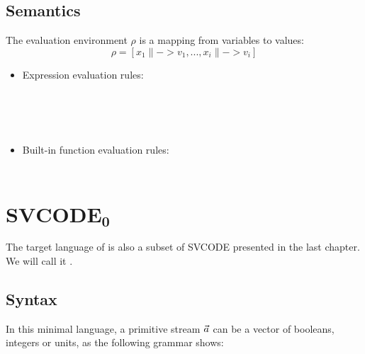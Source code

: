 \subsection{Semantics}
The evaluation environment $\rho$ is a mapping from variables to values: $$ \rho = [x_1 \|-> v_1,...,x_i \|-> v_i]$$ 

\begin{itemize}
\item Expression evaluation rules:
	
	\\[2ex]
	
	\\[2ex]
	
	\\[2ex]
	
\item Built-in function evaluation rules:

	
	 \\[2ex]
	
	
\end{itemize}


\section{$\mathbf{SVCODE_0}$}
The target language of \fmsnesl is also a subset of SVCODE presented in the last chapter. 
We will call it  \fmsvcode.

\subsection{Syntax}
In this minimal language, a primitive stream $\vec a$ can be a vector of booleans, integers or units, as the following grammar shows:

